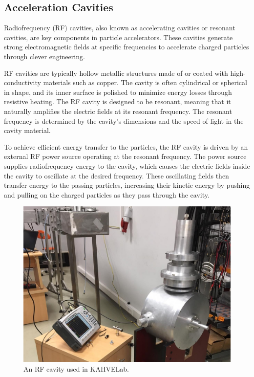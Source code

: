 \documentclass[a4paper,oneside,12pt]{report}
\numberwithin{equation}{chapter}
\begin{document}
\subsection{Acceleration Cavities} \label{sec:theory_cavities}
Radiofrequency (RF) cavities, also known as accelerating cavities or resonant cavities, are key components in particle accelerators. 
These cavities generate strong electromagnetic fields at specific frequencies to accelerate charged particles through clever engineering.

RF cavities are typically hollow metallic structures made of or coated with high-conductivity materials such as copper. 
The cavity is often cylindrical or spherical in shape, and its inner surface is polished to minimize energy losses through resistive heating.
The RF cavity is designed to be resonant, meaning that it naturally amplifies the electric fields at its resonant frequency. 
The resonant frequency is determined by the cavity's dimensions and the speed of light in the cavity material.

To achieve efficient energy transfer to the particles, the RF cavity is driven by an external RF power source operating at the resonant frequency. 
The power source supplies radiofrequency energy to the cavity, which causes the electric fields inside the cavity to oscillate at the desired frequency. 
These oscillating fields then transfer energy to the passing particles, increasing their kinetic energy by pushing and pulling on the charged particles as they pass through the cavity. 
\newline

\begin{figure}[H]
    \centering
    \includegraphics[width=.75\textwidth]{./figures/pill_box.jpeg}
    \vspace{20pt}
    \caption{An RF cavity used in KAHVELab.}
\end{figure}
\end{document}
